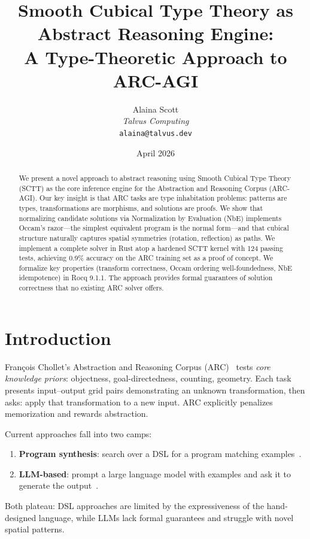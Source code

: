 \documentclass[11pt,a4paper]{article}
\title{Smooth Cubical Type Theory as Abstract Reasoning Engine:\\
A Type-Theoretic Approach to ARC-AGI}
\author{Alaina Scott\\
\textit{Talvus Computing}\\
\texttt{alaina@talvus.dev}}
\date{April 2026}
\begin{document}
\maketitle

\begin{abstract}
We present a novel approach to abstract reasoning using Smooth Cubical
Type Theory (SCTT) as the core inference engine for the Abstraction and
Reasoning Corpus (ARC-AGI).  Our key insight is that ARC tasks are type
inhabitation problems: patterns are types, transformations are morphisms,
and solutions are proofs.  We show that normalizing candidate solutions
via Normalization by Evaluation (NbE) implements Occam's razor---the
simplest equivalent program is the normal form---and that cubical
structure naturally captures spatial symmetries (rotation, reflection)
as paths.  We implement a complete solver in Rust atop a hardened SCTT
kernel with 124 passing tests, achieving 0.9\% accuracy on the ARC
training set as a proof of concept.  We formalize key properties
(transform correctness, Occam ordering well-foundedness, NbE
idempotence) in Rocq 9.1.1.  The approach provides formal guarantees
of solution correctness that no existing ARC solver offers.
\end{abstract}

\section{Introduction}
\label{sec:intro}

Fran\c{c}ois Chollet's Abstraction and Reasoning Corpus
(ARC)~\cite{Chollet2019} tests \emph{core knowledge priors}:
objectness, goal-directedness, counting, geometry.  Each task presents
input--output grid pairs demonstrating an unknown transformation, then
asks: apply that transformation to a new input.  ARC explicitly
penalizes memorization and rewards abstraction.

Current approaches fall into two camps:
\begin{enumerate}[nosep]
  \item \textbf{Program synthesis}: search over a DSL for a program
    matching examples~\cite{Ellis2021,Xu2023}.
  \item \textbf{LLM-based}: prompt a large language model with examples
    and ask it to generate the output~\cite{Greenblatt2024}.
\end{enumerate}

Both plateau: DSL approaches are limited by the expressiveness of the
hand-designed language, while LLMs lack formal guarantees and struggle
with novel spatial patterns.
\end{document}
